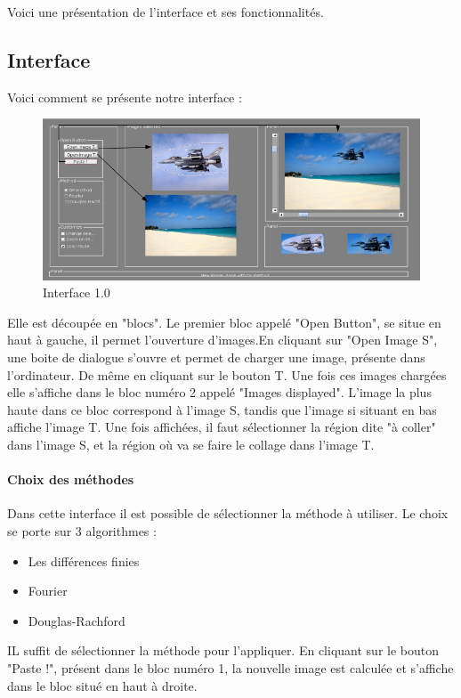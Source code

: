 Voici une présentation de l'interface et ses fonctionnalités.

\subsection{Interface}
Voici comment se présente notre interface : 
\begin{figure}[!h]
    \centering
    \includegraphics[scale = 0.5]{Images/interface.png}
    \caption{Interface 1.0}
\end{figure}{}
Elle est découpée en "blocs". Le premier bloc appelé "Open Button", se situe en haut à gauche, il permet l'ouverture d'images.En cliquant sur "Open Image S", une boite de dialogue s'ouvre et permet de charger une image, présente dans l'ordinateur. De même en cliquant sur le bouton T. Une fois ces images chargées elle s'affiche dans le bloc numéro 2 appelé "Images displayed". L'image la plus haute dans ce bloc correspond à l'image S, tandis que l'image si situant en bas affiche l'image T. Une fois affichées, il faut sélectionner la région dite "à coller" dans l'image S,  et la région où va se faire le collage dans l'image T.\\

\paragraph{Choix des méthodes}
Dans cette interface il est possible de sélectionner la méthode à utiliser. Le choix se porte sur 3 algorithmes : 
\begin{itemize}
    \item Les différences finies
    \item Fourier 
    \item Douglas-Rachford
\end{itemize}{}
IL suffit de sélectionner la méthode pour l'appliquer.
En cliquant sur le bouton "Paste !", présent dans le bloc numéro 1, la nouvelle image est calculée et s'affiche dans le bloc situé en haut à droite. 
